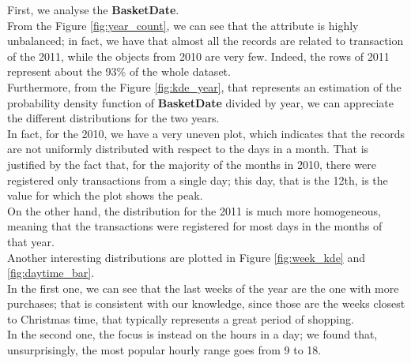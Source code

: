 First, we analyse the \textbf{BasketDate}.\\
From the Figure \ref{fig:year_count}, we can see that the attribute is highly unbalanced; in fact, we have that almost all the records are related to transaction of the 2011, while the objects from 2010 are very few.
Indeed, the rows of 2011 represent about the 93\% of the whole dataset.\\
Furthermore, from the Figure \ref{fig:kde_year}, that represents an estimation of the probability density function of \textbf{BasketDate} divided by year, we can appreciate the different distributions for the two years.\\
In fact, for the 2010, we have a very uneven plot, which indicates that the records are not uniformly distributed with respect to the days in a month. That is justified by the fact that, for the majority of the months in 2010, there were registered only transactions from a single day; this day, that is the 12th, is the value for which the plot shows the peak.\\
On the other hand, the distribution for the 2011 is much more homogeneous, meaning that the transactions were registered for most days in the months of that year.\\
Another interesting distributions are plotted in Figure \ref{fig:week_kde} and \ref{fig:daytime_bar}.\\
In the first one, we can see that the last weeks of the year are the one with more purchases; that is consistent with our knowledge, since those are the weeks closest to Christmas time, that typically represents a great period of shopping.\\	
In the second one, the focus is instead on the hours in a day; we found that, unsurprisingly, the most popular hourly range goes from 9 to 18.

